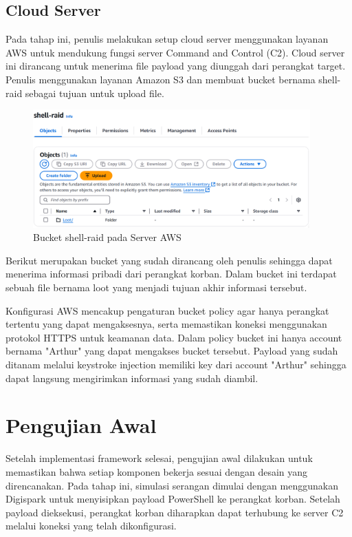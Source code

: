 \subsection{Cloud Server}
Pada tahap ini, penulis melakukan setup cloud server menggunakan layanan AWS untuk mendukung fungsi server Command and Control (C2). Cloud server ini dirancang untuk menerima file payload yang diunggah dari perangkat target. Penulis menggunakan layanan Amazon S3 dan membuat bucket bernama shell-raid sebagai tujuan untuk upload file. 

\begin{figure}
	\centering
	\includegraphics[width=0.95\textwidth]
		{assets/pics/AWSbucket.png}
	\caption{Bucket shell-raid pada Server AWS}
	\label{fig:testGambar}
\end{figure}


Berikut merupakan bucket yang sudah dirancang oleh penulis sehingga dapat menerima informasi pribadi dari perangkat korban. Dalam bucket ini terdapat sebuah file bernama loot yang menjadi tujuan akhir informasi tersebut.

Konfigurasi AWS mencakup pengaturan bucket policy agar hanya perangkat tertentu yang dapat mengaksesnya, serta memastikan koneksi menggunakan protokol HTTPS untuk keamanan data. Dalam policy bucket ini hanya account bernama "Arthur" yang dapat mengakses bucket tersebut. Payload yang sudah ditanam melalui keystroke injection memiliki key dari account "Arthur" sehingga dapat langsung mengirimkan informasi yang sudah diambil.

\section{Pengujian Awal}
Setelah implementasi framework selesai, pengujian awal dilakukan untuk memastikan bahwa setiap komponen bekerja sesuai dengan desain yang direncanakan. Pada tahap ini, simulasi serangan dimulai dengan menggunakan Digispark untuk menyisipkan payload PowerShell ke perangkat korban. Setelah payload dieksekusi, perangkat korban diharapkan dapat terhubung ke server C2 melalui koneksi yang telah dikonfigurasi.


